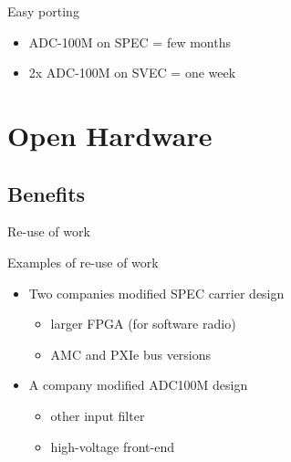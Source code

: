 \documentclass[compress,red]{beamer}
\begin{document}



\begin{frame}{Easy porting}

  \begin{block}{}
    \begin{itemize}
    \item ADC-100M on SPEC = few months
    \item 2x ADC-100M on SVEC = one week
    \end{itemize}
  \end{block}

\end{frame}


\section{Open Hardware}

\subsection{Benefits}

\begin{frame}{Re-use of work}

  \begin{block}{Examples of re-use of work}
    \begin{itemize}
    \item Two companies modified SPEC carrier design
      \begin{itemize}
      \item larger FPGA (for software radio)
      \item AMC and PXIe bus versions
      \end{itemize}
    \item A company modified ADC100M design
      \begin{itemize}
      \item other input filter
      \item high-voltage front-end
      \end{itemize}
    \end{itemize}
  \end{block}

\end{frame}
\end{document}
